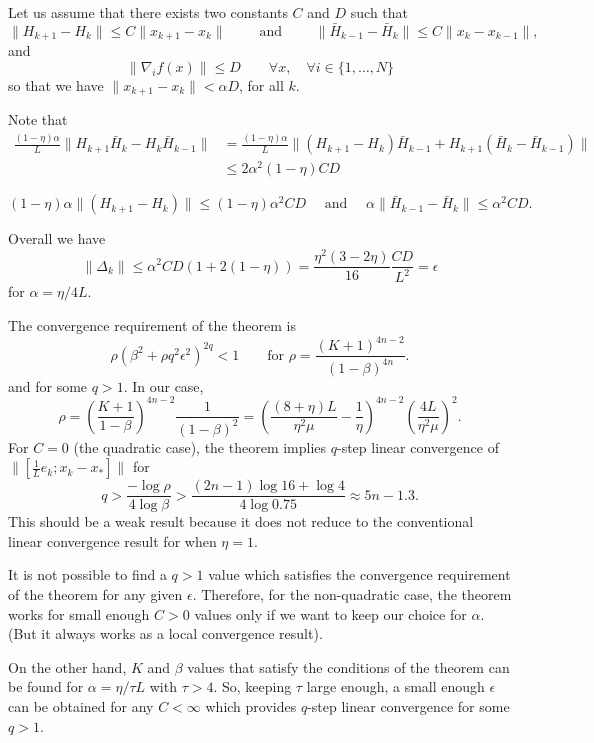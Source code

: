 \documentclass{article}
\begin{document}
\bigskip

Let us assume that there exists two constants $C$ and $D$ such that 
\[
 \|H_{k+1}-H_k\|\leq C\|x_{k+1}-x_k\| \qquad \mbox{ and } \qquad \|\bar H_{k-1}-\bar H_k\|\leq C\|x_k-x_{k-1}\|,
\]
and
\[
  \|\nabla_i f(x)\|\leq D \qquad \forall x, \quad \forall i\in\{1,\dots,N\}  
\]
so that we have $\|x_{k+1}-x_k\|<\alpha D$, for all $k$.

Note that 
\begin{align*}
     \frac{(1-\eta)\alpha}{L}\|H_{k+1}\bar H_k-H_k\bar H_{k-1}\| &= \frac{(1-\eta)\alpha}{L}\|(H_{k+1}-H_k)\bar H_{k-1}+H_{k+1}(\bar H_k-\bar H_{k-1})\|\\
     & \leq 2\alpha^2(1-\eta)C D
\end{align*}

\[
 (1-\eta)\alpha\|(H_{k+1}-H_k)\|\leq (1-\eta)\alpha^2CD  \quad \mbox{ and } \quad \alpha\|\bar H_{k-1}-\bar H_k\| \leq \alpha^2CD.
\]

\bigskip

Overall we have 
\[
 \|\Delta_k\| \leq \alpha^2CD(1 + 2(1-\eta)) = \frac{\eta^2(3-2\eta)}{16}\frac{CD}{L^2} = \epsilon
\]
for $\alpha = \eta / 4L$.

\bigskip

The convergence requirement of the theorem is 
\[
 \rho (\beta^2+\rho q^2 \epsilon^2)^{2q} < 1   \qquad \mbox{for } \rho = \frac{(K+1)^{4n-2}}{(1-\beta)^{4n}}.
\]
and for some $q>1$.  In our case,
\[
 \rho = \left(\frac{K+1}{1-\beta}\right)^{4n-2}\frac{1}{(1-\beta)^2} = \left(\frac{(8+\eta)L}{\eta^2\mu}-\frac{1}{\eta}\right)^{4n-2}\left(\frac{4L}{\eta^2\mu}\right)^2.
\]
For $C=0$ (the quadratic case), the theorem implies $q$-step linear convergence of $\|[\frac{1}{L}e_k; x_k-x_\ast]\|$ for 
\[
 q > \frac{-\log\rho}{4\log\beta} > \frac{(2n-1)\log 16 + \log 4}{4\log 0.75} \approx 5n-1.3.
\]
This should be a weak result because it does not reduce to the conventional linear convergence result for when $\eta=1$.

\bigskip

It is not possible to find a $q>1$ value which satisfies the convergence requirement of the theorem for any given $\epsilon$.  Therefore, for the non-quadratic case, the theorem works for small enough $C>0$ values only if we want to keep our choice for $\alpha$.  (But it always works as a local convergence result).  

\bigskip

On the other hand, $K$ and $\beta$ values that satisfy the conditions of the theorem can be found for $\alpha=\eta/\tau L$ with $\tau>4$.  So, keeping $\tau$ large enough, a small enough $\epsilon$ can be obtained for any $C<\infty$ which provides $q$-step linear convergence for some $q>1$.
\end{document}
